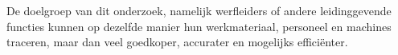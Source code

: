 De doelgroep van dit onderzoek, namelijk werfleiders of andere leidinggevende functies kunnen op dezelfde manier hun werkmateriaal, personeel en machines traceren, maar dan veel goedkoper, accurater en mogelijks efficiënter.

%
%

